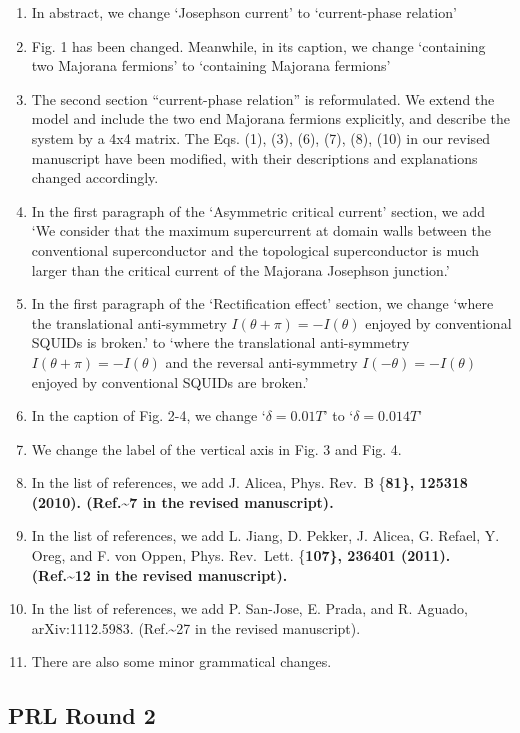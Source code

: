 \documentclass[11pt]{article}
\begin{document}
\begin{enumerate}
\def\labelenumi{(\arabic{enumi})}
\item
  In abstract, we change `Josephson current' to `current-phase relation'
\item
  Fig. 1 has been changed. Meanwhile, in its caption, we change
  `containing two Majorana fermions' to `containing Majorana fermions'
\item
  The second section ``current-phase relation'' is reformulated. We
  extend the model and include the two end Majorana fermions explicitly,
  and describe the system by a 4x4 matrix. The Eqs. (1), (3), (6), (7),
  (8), (10) in our revised manuscript have been modified, with their
  descriptions and explanations changed accordingly.
\item
  In the first paragraph of the `Asymmetric critical current' section,
  we add `We consider that the maximum supercurrent at domain walls
  between the conventional superconductor and the topological
  superconductor is much larger than the critical current of the
  Majorana Josephson junction.'
\item
  In the first paragraph of the `Rectification effect' section, we
  change `where the translational anti-symmetry
  \(I(\theta+\pi)=-I(\theta)\) enjoyed by conventional SQUIDs is
  broken.' to `where the translational anti-symmetry
  \(I(\theta+\pi)=-I(\theta)\) and the reversal anti-symmetry
  \(I(-\theta)=-I(\theta)\) enjoyed by conventional SQUIDs are broken.'
\item
  In the caption of Fig. 2-4, we change `\(\delta=0.01T\)' to
  `\(\delta=0.014T\)'
\item
  We change the label of the vertical axis in Fig. 3 and Fig. 4.
\item
  In the list of references, we add J. Alicea, Phys. Rev.~B \{\bf 81\},
  125318 (2010). (Ref.\textasciitilde{}7 in the revised manuscript).
\item
  In the list of references, we add L. Jiang, D. Pekker, J. Alicea, G.
  Refael, Y. Oreg, and F. von Oppen, Phys. Rev.~Lett. \{\bf 107\},
  236401 (2011). (Ref.\textasciitilde{}12 in the revised manuscript).
\item
  In the list of references, we add P. San-Jose, E. Prada, and R.
  Aguado, arXiv:1112.5983. (Ref.\textasciitilde{}27 in the revised
  manuscript).
\item
  There are also some minor grammatical changes.
\end{enumerate}

\hypertarget{prl-round-2}{%
\subsection{PRL Round 2}\label{prl-round-2}}
\end{document}
